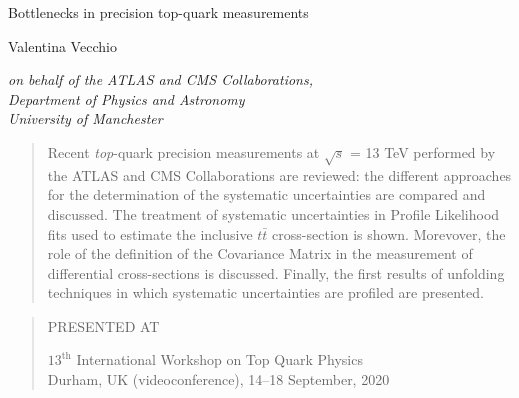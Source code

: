 \documentclass[12pt]{article}
\newcommand\pubnumber{SNSN-323-63}
\newcommand\pubdate{\today}
\def\institute{on behalf of the ATLAS and CMS Collaborations,\\Department of Physics and Astronomy\\ University of Manchester}
\def\Title#1{\begin{center} {\Large #1 } \end{center}}
\def\Author#1{\begin{center}{ \sc #1} \end{center}}
\def\Address#1{\begin{center}{ \it #1} \end{center}}
\newcommand\pubblock{\rightline{\begin{tabular}{l} \pubnumber\\
         \pubdate  \end{tabular}}}
\newenvironment{Abstract}{\begin{quotation}  }{\end{quotation}}
\newenvironment{Presented}{\begin{quotation} \begin{center} 
             PRESENTED AT\end{center}\bigskip 
      \begin{center}\begin{large}}{\end{large}\end{center} \end{quotation}}
\begin{document}
\linenumbers %
\begin{titlepage}
\pubblock

\vfill
\Title{Bottlenecks in precision top-quark measurements}
\vfill
\Author{ Valentina Vecchio}
\Address{\institute}
\vfill
\begin{Abstract}
Recent \emph{top}-quark precision measurements at $\sqrt{s}$ = 13 TeV performed by the ATLAS and CMS Collaborations are reviewed: the different approaches for the determination of the systematic uncertainties are compared and discussed. 
The treatment of systematic uncertainties in Profile Likelihood fits used to estimate the inclusive $t\bar{t}$ cross-section is shown. Morevover, the role of the definition of the Covariance Matrix in the measurement of differential cross-sections is discussed. Finally, the first results of unfolding techniques in which systematic uncertainties are profiled are presented.

\end{Abstract}
\vfill
\begin{Presented}
$13^\mathrm{th}$ International Workshop on Top Quark Physics\\
Durham, UK (videoconference), 14--18 September, 2020
\end{Presented}
\vfill
\end{titlepage}
\def\thefootnote{\fnsymbol{footnote}}
\setcounter{footnote}{0}
%
\end{document}
